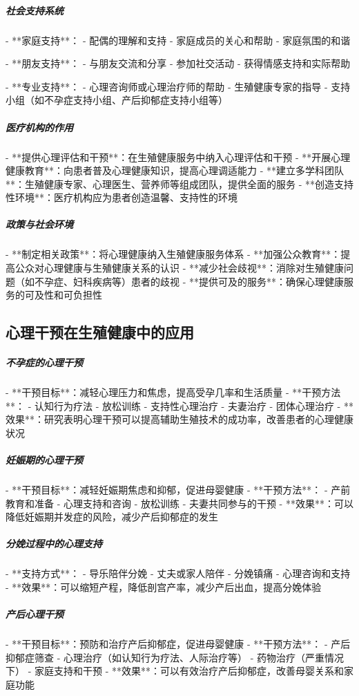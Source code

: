 \begin{enumerate}
\subparagraph{社会支持系统}

- **家庭支持**：
  - 配偶的理解和支持
  - 家庭成员的关心和帮助
  - 家庭氛围的和谐

- **朋友支持**：
  - 与朋友交流和分享
  - 参加社交活动
  - 获得情感支持和实际帮助

- **专业支持**：
  - 心理咨询师或心理治疗师的帮助
  - 生殖健康专家的指导
  - 支持小组（如不孕症支持小组、产后抑郁症支持小组等）

\subparagraph{医疗机构的作用}

- **提供心理评估和干预**：在生殖健康服务中纳入心理评估和干预
- **开展心理健康教育**：向患者普及心理健康知识，提高心理调适能力
- **建立多学科团队**：生殖健康专家、心理医生、营养师等组成团队，提供全面的服务
- **创造支持性环境**：医疗机构应为患者创造温馨、支持性的环境

\subparagraph{政策与社会环境}

- **制定相关政策**：将心理健康纳入生殖健康服务体系
- **加强公众教育**：提高公众对心理健康与生殖健康关系的认识
- **减少社会歧视**：消除对生殖健康问题（如不孕症、妇科疾病等）患者的歧视
- **提供可及的服务**：确保心理健康服务的可及性和可负担性

\subsection{心理干预在生殖健康中的应用}

\subparagraph{不孕症的心理干预}

- **干预目标**：减轻心理压力和焦虑，提高受孕几率和生活质量
- **干预方法**：
  - 认知行为疗法
  - 放松训练
  - 支持性心理治疗
  - 夫妻治疗
  - 团体心理治疗
- **效果**：研究表明心理干预可以提高辅助生殖技术的成功率，改善患者的心理健康状况

\subparagraph{妊娠期的心理干预}

- **干预目标**：减轻妊娠期焦虑和抑郁，促进母婴健康
- **干预方法**：
  - 产前教育和准备
  - 心理支持和咨询
  - 放松训练
  - 夫妻共同参与的干预
- **效果**：可以降低妊娠期并发症的风险，减少产后抑郁症的发生

\subparagraph{分娩过程中的心理支持}

- **支持方式**：
  - 导乐陪伴分娩
  - 丈夫或家人陪伴
  - 分娩镇痛
  - 心理咨询和支持
- **效果**：可以缩短产程，降低剖宫产率，减少产后出血，提高分娩体验

\subparagraph{产后心理干预}

- **干预目标**：预防和治疗产后抑郁症，促进母婴健康
- **干预方法**：
  - 产后抑郁症筛查
  - 心理治疗（如认知行为疗法、人际治疗等）
  - 药物治疗（严重情况下）
  - 家庭支持和干预
- **效果**：可以有效治疗产后抑郁症，改善母婴关系和家庭功能


\end{enumerate}
